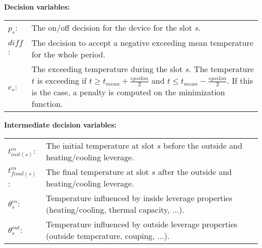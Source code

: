 \documentclass{article}
\begin{document}
\noindent
\textbf{Decision variables:} \\
\begin{tabular}{ l p{} }
$p_s$: & The on/off decision for the device for the slot $s$. \\
$diff$: & The decision to accept a negative exceeding mean temperature for the whole period. \\
$e_s$: & The exceeding temperature during the slot $s$. The temperature $t$ is exceeding if $t \ge t_{mean} + \frac {epsilon}{2}$ and $t \le t_{mean} - \frac {epsilon}{2}$. If this is the case, a penalty is computed on the minimization function. \\
\end{tabular} 
\vspace{0.3cm}

\noindent
\textbf{Intermediate decision variables:} \\
\begin{tabular}{ l p{} }
$t^{in}_{init(s)}$: & The initial temperature at slot $s$ before the outside and heating/cooling leverage. \\
$t^{in}_{final(s)}$: & The final temperature at slot $s$ after the outside and heating/cooling leverage. \\
$\theta^{in}_{s}$: & Temperature influenced by inside leverage properties (heating/cooling, thermal capacity, ...). \\
$\theta^{out}_{s}$: & Temperature influenced by outside leverage properties (outside temperature, couping, ...).\\
  
\end{tabular} 
  
  
\end{document}

